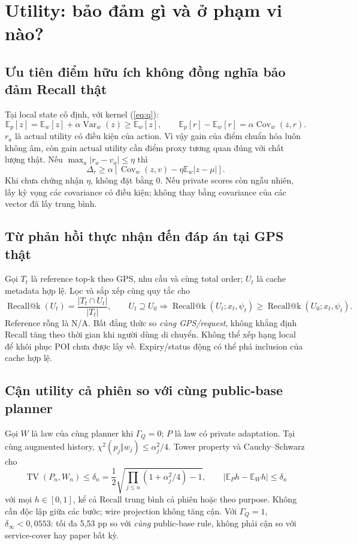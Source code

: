 \documentclass[10pt,a4paper]{article}
\newcommand{\TV}{\operatorname{TV}}
\begin{document}
\clearpage
\section{Utility: bảo đảm gì và ở phạm vi nào?}
\subsection{Ưu tiên điểm hữu ích không đồng nghĩa bảo đảm Recall thật}
Tại local state cố định, với kernel (\ref{eq:q}):
\begin{equation}
\mathbb E_p[z]=\mathbb E_w[z]+\alpha\operatorname{Var}_w(z)\ge\mathbb E_w[z],\qquad
\mathbb E_p[r]-\mathbb E_w[r]=\alpha\operatorname{Cov}_w(z,r).
\label{eq:gain}
\end{equation}
$r_a$ là actual utility có điều kiện của action. Vì vậy gain của điểm chuẩn hóa luôn không âm, còn gain
actual utility cần điểm proxy tương quan đúng với chất lượng thật. Nếu $\max_a|r_a-v_a|\le\eta$ thì
\[
\Delta_r\ge\alpha\left[\operatorname{Cov}_w(z,v)-\eta\mathbb E_w|z-\mu|\right].
\]
Khi chưa chứng nhận $\eta$, không đặt bằng 0. Nếu private scores còn ngẫu nhiên, lấy kỳ vọng các
covariance có điều kiện; không thay bằng covariance của các vector đã lấy trung bình.

\subsection{Từ phản hồi thực nhận đến đáp án tại GPS thật}
Gọi $T_t$ là reference top-k theo GPS, nhu cầu và cùng total order; $U_t$ là cache metadata hợp lệ.
Lọc và sắp xếp cùng quy tắc cho
\begin{equation}
\operatorname{Recall@k}(U_t)=\frac{|T_t\cap U_t|}{|T_t|},\qquad
U_t\supseteq U_0\Longrightarrow\operatorname{Recall@k}(U_t;x_t,\psi_t)
\ge\operatorname{Recall@k}(U_0;x_t,\psi_t).
\label{eq:cache}
\end{equation}
Reference rỗng là N/A. Bất đẳng thức so \emph{cùng GPS/request}, không khẳng định Recall tăng theo thời gian
khi người dùng di chuyển. Không thể xếp hạng local để khôi phục POI chưa được lấy về. Expiry/status động
có thể phá inclusion của cache hợp lệ.

\subsection{Cận utility cả phiên so với cùng public-base planner}
Gọi $W$ là law của cùng planner khi $\Gamma_Q=0$; $P$ là law có private adaptation.
Tại cùng augmented history, $\chi^2(p_j\Vert w_j)\le\alpha_j^2/4$. Tower property và Cauchy--Schwarz cho
\begin{equation}
\TV(P_n,W_n)\le\delta_n=\frac12\sqrt{\prod_{j\le n}(1+\alpha_j^2/4)-1},\qquad
|\mathbb E_Ph-\mathbb E_Wh|\le\delta_n
\label{eq:utilitypath}
\end{equation}
với mọi $h\in[0,1]$, kể cả Recall trung bình cả phiên hoặc theo purpose. Không cần độc lập giữa các bước;
wire projection không tăng cận. Với $\Gamma_Q=1$, $\delta_\infty<0{,}0553$: tối đa 5,53 pp so với \emph{cùng}
public-base rule, không phải cận so với service-cover hay paper bất kỳ.
\end{document}
